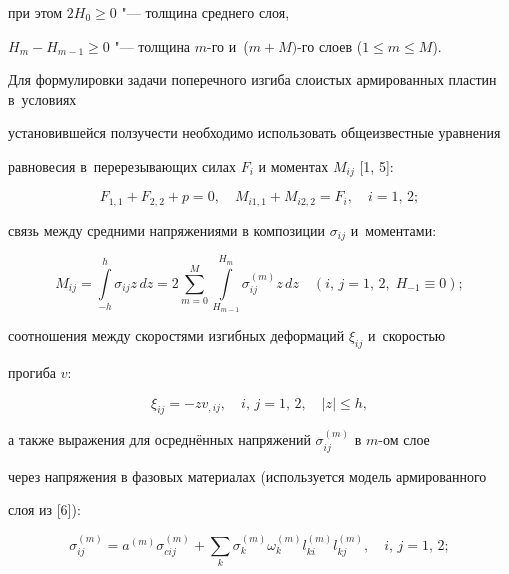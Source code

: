 при этом $2H_0 \geqslant 0$ "--- толщина среднего слоя, 

$H_m - H_{m - 1} \geqslant 0$ "--- толщина $m$-го и~($m + M)$-го слоев ($1 \leqslant m \leqslant M$).



Для формулировки задачи поперечного изгиба слоистых армированных пластин в~условиях 

установившейся ползучести необходимо использовать общеизвестные уравнения 

равновесия в~перерезывающих силах $F_i $ и моментах $M_{ij} $ [1, 5]:

\begin{equation}

\label{nemir:eq1}

F_{1 ,1} + F_{2 ,2} + p = 0, \quad M_{i1 ,1} + M_{i2,2} = F_i,\quad i = 1,\,2;

\end{equation}

связь между средними напряжениями в композиции $\sigma _{ij} $ и~моментами:

\begin{equation}

\label{nemir:eq2}

M_{ij} = \int\limits_{- h}^h \sigma _{ij} z\,dz = 

2\sum\limits_{m = 0}^M \int\limits_{H_{m - 1} }^{H_m } \sigma _{ij}^{(m)}  z\,dz \quad 

(i,\,j = 1,\,2,\; H_{-1} \equiv 0);

\end{equation}

соотношения между скоростями изгибных деформаций $\xi _{ij} $ и~скоростью 

прогиба $v$:

\begin{equation}

\label{nemir:eq3}

\xi _{ij} = - zv_{,ij}, \quad i,\,j = 1,\,2,\quad  \left| z \right| \leqslant h,

\end{equation}

а также выражения для осреднённых напряжений $\sigma _{ij}^{(m)} $ в $m$-ом слое 

через напряжения в фазовых материалах (используется модель армированного 

слоя из [6]):

\begin{equation}

\label{nemir:eq4}

\sigma _{ij}^{(m)} = a^{(m)}\sigma _{cij}^{(m)} + 

\sum\limits_k {\sigma_k^{(m)} } \omega _k^{(m)} l_{ki}^{(m)} l_{kj}^{(m)} ,\quad i,\,j = 1,\,2;

\end{equation}


